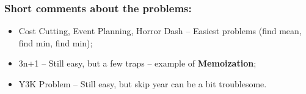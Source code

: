 \begin{frame}
  \frametitle{Short comments about the problems:}
  \begin{itemize}
  \item Cost Cutting, Event Planning, Horror Dash -- Easiest problems (find mean, find min, find min);
    \bigskip

  \item 3n+1 -- Still easy, but a few traps -- example of {\bf Memoization};
    \bigskip

  \item Y3K Problem -- Still easy, but skip year can be a bit troublesome.
    
  \end{itemize}
\end{frame}

